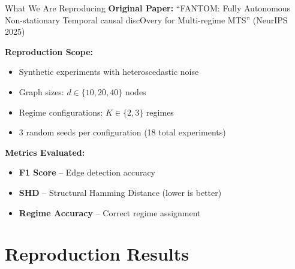 \documentclass[aspectratio=169]{beamer}
\begin{document}
\begin{frame}{What We Are Reproducing}
\textbf{Original Paper:} ``FANTOM: Fully Autonomous Non-stationary Temporal causal discOvery for Multi-regime MTS'' (NeurIPS 2025)

\vspace{0.3cm}
\textbf{Reproduction Scope:}
\begin{itemize}
    \item Synthetic experiments with heteroscedastic noise
    \item Graph sizes: $d \in \{10, 20, 40\}$ nodes
    \item Regime configurations: $K \in \{2, 3\}$ regimes
    \item 3 random seeds per configuration (18 total experiments)
\end{itemize}

\vspace{0.3cm}
\textbf{Metrics Evaluated:}
\begin{itemize}
    \item \textbf{F1 Score} -- Edge detection accuracy
    \item \textbf{SHD} -- Structural Hamming Distance (lower is better)
    \item \textbf{Regime Accuracy} -- Correct regime assignment
\end{itemize}
\end{frame}

\section{Reproduction Results}
\end{document}
